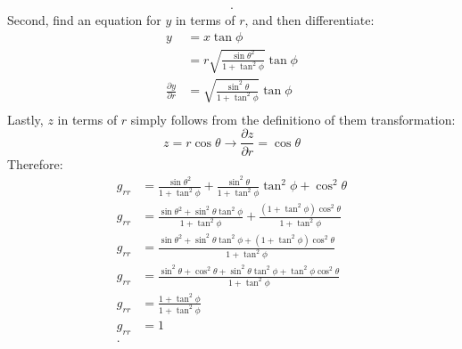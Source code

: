 \documentclass[a4paper]{article}
\begin{document}
\begin{enumerate}
\[\begin{align*}
    .\end{align*}
  \]
  Second, find an equation for $y$ in terms of $r$, and then differentiate:
  \[
  \begin{align*}
    y&= x \tan\phi\\
     &= r\sqrt{\frac{\sin\theta^2}{1+\tan^2\phi}} \tan\phi \\
    \frac{\partial y}{\partial r}  &= \sqrt{\frac{\sin^2\theta}{1+\tan^2\phi}}\tan\phi\\
  \end{align*}
  \]
  Lastly, $z$ in terms of $r$ simply follows from the definitiono of them
  transformation:
  \[
  z = r\cos\theta \to \frac{\partial z}{\partial r} = \cos\theta
  \]
  Therefore:
  \[
    \begin{align*}
      g_{rr}&=\frac{\sin\theta^2}{1+\tan^2\phi} + \frac{\sin^2\theta}{1+\tan^2\phi}\tan^2\phi + \cos^2\theta\\
      g_{rr}&=\frac{\sin\theta^2 + \sin^2\theta\tan^2\phi}{1+\tan^2\phi} +\frac{(1+\tan^2\phi)\cos^2\theta}{1+\tan^2\phi}\\
      g_{rr}&=\frac{\sin\theta^2 + \sin^2\theta\tan^2\phi+(1+\tan^2\phi)\cos^2\theta}{1+\tan^2\phi}\\
      g_{rr}&=\frac{\sin^2\theta + \cos^2\theta+\sin^2\theta\tan^2\phi+\tan^2\phi\cos^2\theta}{1+\tan^2\phi}\\
      g_{rr}&=\frac{1+\tan^2\phi}{1+\tan^2\phi}\\
      g_{rr}&=1\\
    .\end{align*}
  \]
  \end{enumerate}
\end{document}
